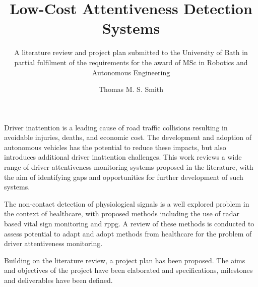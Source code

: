 \documentclass[11pt, parskip=half*,twoside=false]{scrbook}
\title{Low-Cost Attentiveness Detection Systems}
\author{Thomas M. S. Smith}
\subtitle{A literature review and project plan submitted to the University of Bath in partial fulfilment of the requirements for the award of MSc in Robotics and Autonomous Engineering}
\begin{document}
\maketitle

\frontmatter


%
%



Driver inattention is a leading cause of road traffic collisions resulting in avoidable injuries, deaths, and economic cost. The development and adoption of autonomous vehicles has the potential to reduce these impacts, but also introduces additional driver inattention challenges. This work reviews a wide range of driver attentiveness monitoring systems proposed in the literature, with the aim of identifying gaps and opportunities for further development of such systems.

The non-contact detection of physiological signals is a well explored problem in the context of healthcare, with proposed methods including the use of radar based vital sign monitoring and \glsdesc{rppg}. A review of these methods is conducted to assess potential to adapt and adopt methods from healthcare for the problem of driver attentiveness monitoring.

Building on the literature review, a project plan has been proposed. The aims and objectives of the project have been elaborated and specifications, milestones and deliverables have been defined.

\tableofcontents
\end{document}
